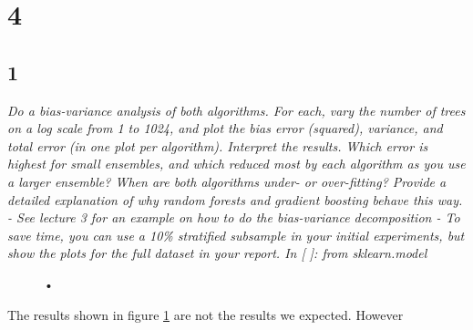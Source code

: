 \documentclass[a4paper,12pt]{article}
\begin{document}
{\section*{4}
\subsection*{1}
{\it Do a bias-variance analysis of both algorithms. For each, vary the number of trees on a log scale from 1 to 1024, and plot the bias error (squared), variance, and total error (in one plot per algorithm). Interpret the results. Which error is highest for small ensembles, and which reduced most by each algorithm as you use a larger ensemble? When are both algorithms under- or over-fitting? Provide a detailed explanation of why random forests and gradient boosting behave this way. - See lecture 3 for an example on how to do the bias-variance decomposition - To save time, you can use a 10\% stratified subsample in your initial experiments, but show the plots for the full dataset in your report. In [ ]: from sklearn.model}

\begin{figure}[H]
\hfill
{}
\hfill
\caption{•}
\label{Q41}
\end{figure}

The results shown in figure \ref{Q41} are not the results we expected. However 

}
\end{document}
